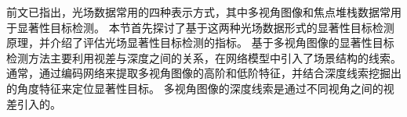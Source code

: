 %
%
%
%
%
%
%
%
%
%
%
%
前文已指出，光场数据常用的四种表示方式，其中多视角图像和焦点堆栈数据常用于显著性目标检测。
本节首先探讨了基于这两种光场数据形式的显著性目标检测原理，并介绍了评估光场显著性目标检测的指标。
%
%
%
%
%
%
基于多视角图像的显著性目标检测方法主要利用视差与深度之间的关系，在网络模型中引入了场景结构的线索。
通常，通过编码网络来提取多视角图像的高阶和低阶特征，并结合深度线索挖掘出的角度特征来定位显著性目标。
多视角图像的深度线索是通过不同视角之间的视差引入的。

